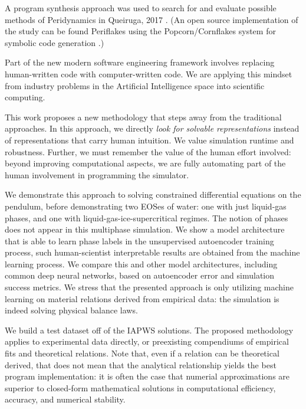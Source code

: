 \documentclass[]{article}
\begin{document}
\cite{wu_physics-informed_2018}
\cite{xie_tempogan:_2018}

 A program synthesis approach was used to search for and evaluate
 possible methods of Peridynamics in Queiruga, 2017
 \cite{queiruga_numerical_2017}. (An open source implementation of the
 study can be found Periflakes\cite{queiruga_periflakes_2019} using the
 Popcorn/Cornflakes system for symbolic code generation
 \cite{queiruga_cornflakes:_2018,queiruga_popcorn:_2018}.)

Part of the new modern software engineering framework involves replacing
human-written code with computer-written code. We are applying this
mindset from industry problems in the Artificial
Intelligence space into scientific computing.


This work proposes a new methodology that steps away from the
traditional approaches. 
In this approach, we directly \emph{look for solvable representations}
instead of representations that carry human intuition. We value
simulation runtime and robustness. Further, we must remember the value
of the human effort involved: beyond improving computational aspects,
we are fully automating part of the human involvement in programming
the simulator.




We demonstrate this approach to solving constrained differential
equations on the pendulum, before demonstrating two EOSes of water: one
with just liquid-gas phases, and one with liquid-gas-ice-supercritical
regimes. The notion of phases does not appear in this multiphase
simulation. We show a model architecture that is able to learn phase
labels in the unsupervised autoencoder training process, such
human-scientist interpretable results are obtained from the machine
learning process. We compare this and other model architectures,
including common deep neural networks, based on autoencoder error and
simulation success metrics. We stress that the presented approach is
only utilizing machine learning on material relations derived from
empirical data: the simulation is indeed solving physical balance laws.

We build a test dataset off of the IAPWS solutions. The proposed
methodology applies to experimental data directly, or preexisting
compendiums of empirical fits and theoretical relations.
Note that, even if a relation can be theoretical derived, that does
not mean that the analytical relationship yields the best program
implementation: it is often the case that numerial approximations are
superior to closed-form mathematical solutions in computational
efficiency, accuracy, and numerical stability.
\end{document}
